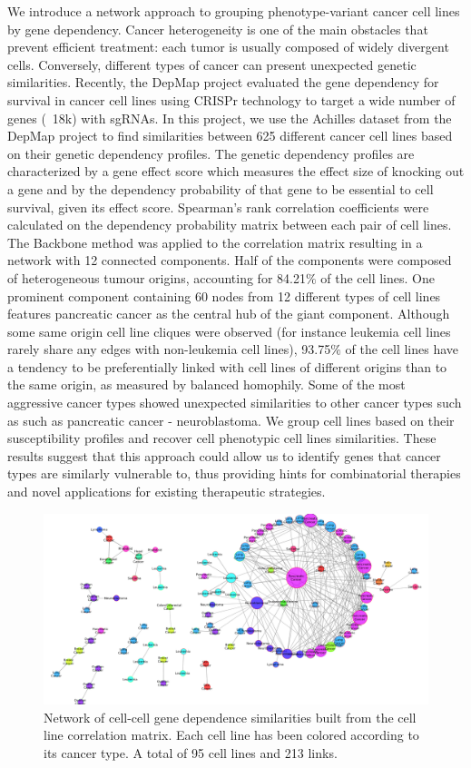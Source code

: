 \documentclass[12pt]{article}
\begin{document}
We introduce a network approach to grouping phenotype-variant cancer cell lines by gene dependency. Cancer heterogeneity is one of the main obstacles that prevent efficient treatment: each tumor is usually composed of widely divergent cells. Conversely, different types of cancer can present unexpected genetic similarities. Recently, the DepMap project \cite{} evaluated the gene dependency for survival in cancer cell lines using CRISPr technology to target a wide number of genes (~18k) with sgRNAs. In this project, we use the Achilles dataset from the DepMap project to find similarities between 625 different cancer cell lines based on their genetic dependency profiles. The genetic dependency profiles are characterized by a gene effect score which measures the effect size of knocking out a gene and by the dependency probability of that gene to be essential to cell survival, given its effect score. Spearman’s rank correlation coefficients were calculated on the dependency probability matrix between each pair of cell lines. The Backbone method \cite{} was applied to the correlation matrix resulting in a network with 12 connected components. Half of the components were composed of heterogeneous tumour origins, accounting for 84.21$\%$ of the cell lines. One prominent component containing 60 nodes from 12 different types of cell lines features pancreatic cancer as the central hub of the giant component. Although some same origin cell line cliques were observed (for instance leukemia cell lines rarely share any edges with non-leukemia cell lines), 93.75$\%$ of the cell lines have a tendency to be preferentially linked with cell lines of different origins than to the same origin, as measured by balanced homophily. Some of the most aggressive cancer types showed unexpected similarities to other cancer types such as such as pancreatic cancer - neuroblastoma. We group cell lines based on their susceptibility profiles and recover cell phenotypic cell lines similarities. These results suggest that this approach could allow us to identify genes that cancer types are similarly vulnerable to, thus providing hints for combinatorial therapies and novel applications for existing therapeutic strategies. 



\begin{figure}[h]
\centering
\includegraphics[width=1\columnwidth]{fig1.pdf}
\caption{Network of cell-cell gene dependence similarities built from the cell line correlation matrix. Each cell line has been colored according to its cancer type. A total of 95 cell lines and 213 links.}
\label{fig:sinx}
\end{figure}
\end{document}
